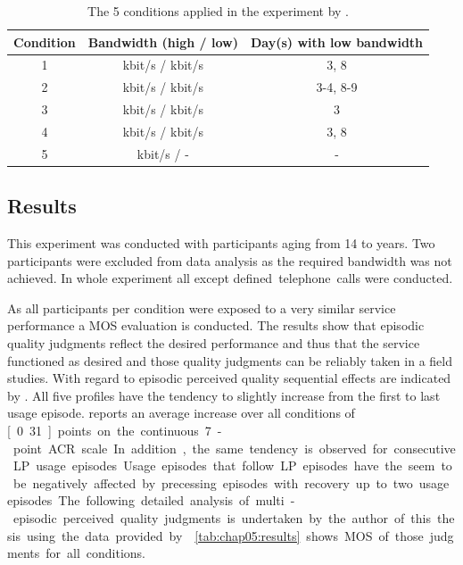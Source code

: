 \begin{table}[h]
	\centering
	\begin{tabular}{|c||c|c|}
	Condition & Bandwidth (high / low) & Day(s) with low bandwidth \\
	\hline
	1 & \unit[500]{kbit/s} / \unit[32]{kbit/s} & 3, 8 \\
	2 & \unit[500]{kbit/s} / \unit[32]{kbit/s} & 3-4, 8-9 \\
	3 & \unit[500]{kbit/s} / \unit[32]{kbit/s} & 3 \\
	4 & \unit[150]{kbit/s} / \unit[32]{kbit/s} & 3, 8 \\
	5 & \unit[500]{kbit/s} / - & - \\
	\hline
	\end{tabular}
	\caption{The 5 conditions applied in the experiment by \cite{moller_single-call_2011}.}
	\label{tab:chap05:conditions}
\end{table}

\subsection{Results}
This experiment was conducted with \unit[58]{participants} aging from 14 to \unit[64]{years}.%
Two participants were excluded from data analysis as the required bandwidth was not achieved.
In whole experiment all except \unit[6]{defined telephone calls} were conducted.

As all participants per condition were exposed to a very similar service performance a \ac{MOS} evaluation is conducted.
The results show that episodic quality judgments reflect the desired performance and thus that the service functioned as desired and those quality judgments can be reliably taken in a field studies.
With regard to episodic perceived quality sequential effects are indicated by  \cite{moller_single-call_2011}.
All five profiles have the tendency to slightly increase from the first to last usage episode.
\cite{moller_single-call_2011} reports an average increase over all conditions of \unit[0.31]{points} on the continuous 7-point \ac{ACR} scale.
In addition, the same tendency is observed for consecutive \ac{LP} usage episodes.
Usage episodes that follow \ac{LP} episodes have the seem to be negatively affected by precessing  episodes with recovery up to two usage episodes.

The following detailed analysis of multi-episodic perceived quality judgments is undertaken by the author of this thesis using the data provided by \cite{moller_single-call_2011}.
\autoref{tab:chap05:results} shows \ac{MOS} of those judgments for all conditions.


